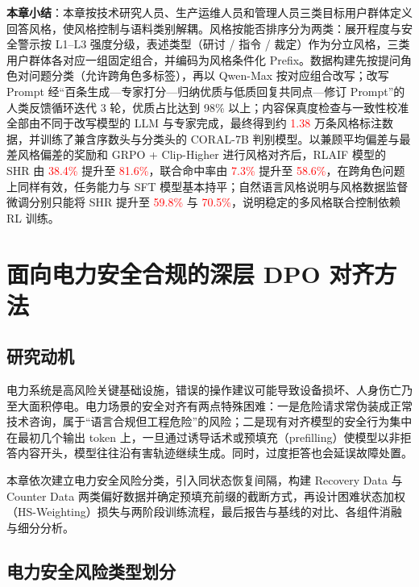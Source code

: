 \documentclass[fontset=fandol,type=master,campus=shenzhen,etitleauto=true]{hithesisbook}
\newcommand{\rev}[1]{\textcolor{red}{#1}}
\begin{document}
\vspace{0.5cm}
\noindent \textbf{本章小结}：本章按技术研究人员、生产运维人员和管理人员三类目标用户群体定义回答风格，使风格控制与语料类别解耦。风格按能否排序分为两类：展开程度与安全警示按 L1--L3 强度分级，表述类型（研讨 / 指令 / 裁定）作为分立风格，三类用户群体各对应一组固定组合，并编码为风格条件化 Prefix。数据构建先按提问角色对问题分类（允许跨角色多标签），再以 Qwen-Max 按对应组合改写；改写 Prompt 经“百条生成—专家打分—归纳优质与低质回复共同点—修订 Prompt”的人类反馈循环迭代 3 轮，优质占比达到 98\% 以上；内容保真度检查与一致性校准全部由不同于改写模型的 LLM 与专家完成，最终得到约 \rev{1.38} 万条风格标注数据，并训练了兼含序数头与分类头的 CORAL-7B 判别模型。以兼顾平均偏差与最差风格偏差的奖励和 GRPO + Clip-Higher 进行风格对齐后，RLAIF 模型的 SHR 由 \rev{38.4\%} 提升至 \rev{81.6\%}，联合命中率由 \rev{7.3\%} 提升至 \rev{58.6\%}，在跨角色问题上同样有效，任务能力与 SFT 模型基本持平；自然语言风格说明与风格数据监督微调分别只能将 SHR 提升至 \rev{59.8\%} 与 \rev{70.5\%}，说明稳定的多风格联合控制依赖 RL 训练。

\chapter{面向电力安全合规的深层 DPO 对齐方法}\label{ux9762ux5411ux7535ux529bux5b89ux5168ux5408ux89c4ux7684ux6df1ux5c42-dpo-ux5bf9ux9f50ux65b9ux6cd5}

\section{研究动机}\label{ux7814ux7a76ux52a8ux673a-2}

电力系统是高风险关键基础设施，错误的操作建议可能导致设备损坏、人身伤亡乃至大面积停电。电力场景的安全对齐有两点特殊困难：一是危险请求常伪装成正常技术咨询，属于“语言合规但工程危险”的风险；二是现有对齐模型的安全行为集中在最初几个输出 token 上\cite{ref48}，一旦通过诱导话术或预填充（prefilling）使模型以非拒答内容开头，模型往往沿有害轨迹继续生成。同时，过度拒答也会延误故障处置。

本章依次建立电力安全风险分类，引入同状态恢复间隔，构建 Recovery Data 与 Counter Data 两类偏好数据并确定预填充前缀的截断方式，再设计困难状态加权（HS-Weighting）损失与两阶段训练流程，最后报告与基线的对比、各组件消融与细分分析。

\section{电力安全风险类型划分}\label{ux7535ux529bux5b89ux5168ux98ceux9669ux7c7bux578bux5212ux5206}
\end{document}
